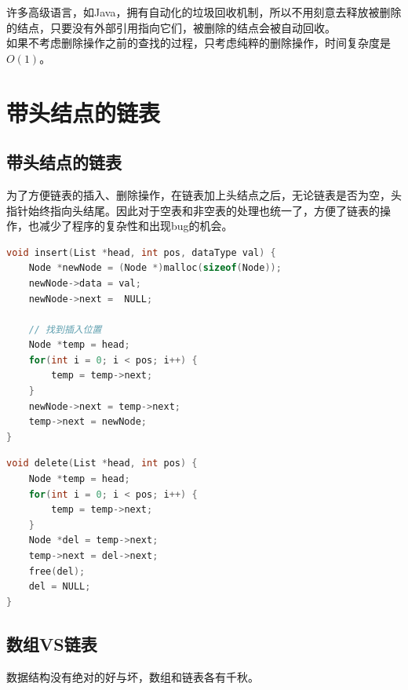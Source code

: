 许多高级语言，如Java，拥有自动化的垃圾回收机制，所以不用刻意去释放被删除的结点，只要没有外部引用指向它们，被删除的结点会被自动回收。 \\

如果不考虑删除操作之前的查找的过程，只考虑纯粹的删除操作，时间复杂度是$ O(1) $。

\newpage

\section{带头结点的链表}

\subsection{带头结点的链表}

为了方便链表的插入、删除操作，在链表加上头结点之后，无论链表是否为空，头指针始终指向头结尾。因此对于空表和非空表的处理也统一了，方便了链表的操作，也减少了程序的复杂性和出现bug的机会。


\begin{lstlisting}[language=C]
void insert(List *head, int pos, dataType val) {
    Node *newNode = (Node *)malloc(sizeof(Node));
    newNode->data = val;
    newNode->next =  NULL;
    
    // 找到插入位置
    Node *temp = head;
    for(int i = 0; i < pos; i++) {
        temp = temp->next;
    }
    newNode->next = temp->next;
    temp->next = newNode;
}
\end{lstlisting}


\begin{lstlisting}[language=C]
void delete(List *head, int pos) {
    Node *temp = head;
    for(int i = 0; i < pos; i++) {
        temp = temp->next;
    }
    Node *del = temp->next;
    temp->next = del->next;
    free(del);
    del = NULL;
}
\end{lstlisting}

\subsection{数组VS链表}

数据结构没有绝对的好与坏，数组和链表各有千秋。

